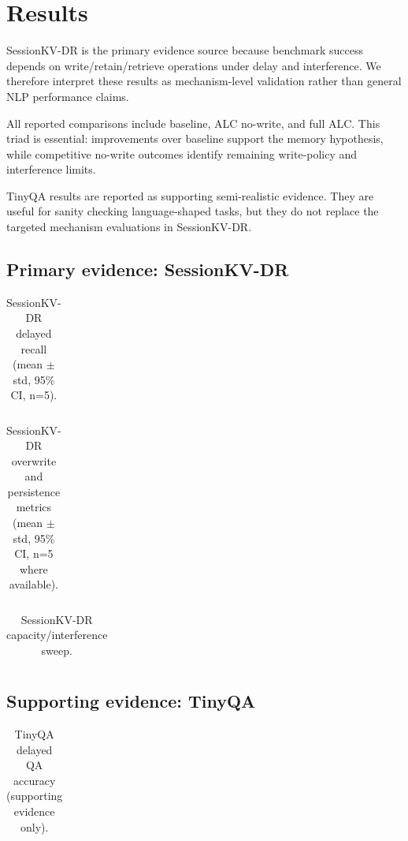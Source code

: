 \section{Results}
SessionKV-DR is the primary evidence source because benchmark success depends on write/retain/retrieve operations under delay and interference. We therefore interpret these results as mechanism-level validation rather than general NLP performance claims.

All reported comparisons include baseline, ALC no-write, and full ALC. This triad is essential: improvements over baseline support the memory hypothesis, while competitive no-write outcomes identify remaining write-policy and interference limits.

TinyQA results are reported as supporting semi-realistic evidence. They are useful for sanity checking language-shaped tasks, but they do not replace the targeted mechanism evaluations in SessionKV-DR.

\subsection{Primary evidence: SessionKV-DR}
\begin{table}[h]
\centering
\begin{tabular}{llll}
\toprule

\bottomrule
\end{tabular}
\caption{SessionKV-DR delayed recall (mean $\pm$ std, 95\% CI, n=5).}
\end{table}

\begin{table}[h]
\centering
\begin{tabular}{llll}
\toprule

\bottomrule
\end{tabular}
\caption{SessionKV-DR overwrite and persistence metrics (mean $\pm$ std, 95\% CI, n=5 where available).}
\end{table}

\begin{table}[h]
\centering
\begin{tabular}{llll}
\toprule

\bottomrule
\end{tabular}
\caption{SessionKV-DR capacity/interference sweep.}
\end{table}

\subsection{Supporting evidence: TinyQA}
\begin{table}[h]
\centering
\begin{tabular}{llll}
\toprule

\bottomrule
\end{tabular}
\caption{TinyQA delayed QA accuracy (supporting evidence only).}
\end{table}


